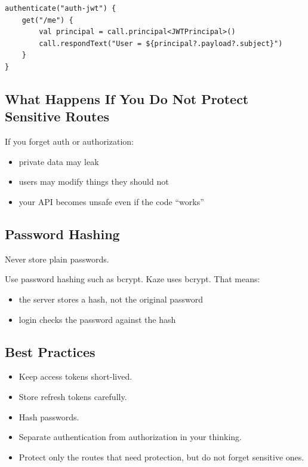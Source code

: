 \documentclass[11pt,a4paper]{article}
\begin{document}
\begin{lstlisting}[style=kazekotlin]
authenticate("auth-jwt") {
    get("/me") {
        val principal = call.principal<JWTPrincipal>()
        call.respondText("User = ${principal?.payload?.subject}")
    }
}
\end{lstlisting}

\subsection{What Happens If You Do Not Protect Sensitive Routes}

If you forget auth or authorization:
\begin{itemize}
    \item private data may leak
    \item users may modify things they should not
    \item your API becomes unsafe even if the code ``works''
\end{itemize}

\subsection{Password Hashing}

Never store plain passwords.

Use password hashing such as bcrypt. Kaze uses bcrypt. That means:
\begin{itemize}
    \item the server stores a hash, not the original password
    \item login checks the password against the hash
\end{itemize}

\subsection{Best Practices}

\begin{itemize}
    \item Keep access tokens short-lived.
    \item Store refresh tokens carefully.
    \item Hash passwords.
    \item Separate authentication from authorization in your thinking.
    \item Protect only the routes that need protection, but do not forget sensitive ones.
\end{itemize}
\end{document}
